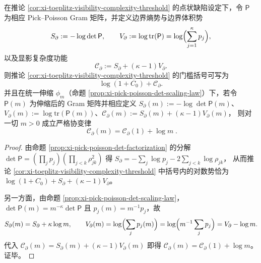 
\begin{corollary}[统一伸缩下的显影复杂度“异常”协变律：\texorpdfstring{$\mathscr{C}_{\partial}(m)=\mathscr{C}_{\partial}(1)+\log m$}{C(m)=C(1)+log m}]\label{cor:xi-toeplitz-visibility-complexity-anomaly}
在推论 \ref{cor:xi-toeplitz-visibility-complexity-threshold} 的点状缺陷设定下，令 \(\mathsf P\) 为相应 Pick--Poisson Gram 矩阵，并定义边界熵势与边界体积势
\[
S_{\partial}:=-\log\det\mathsf P,
\qquad
V_{\partial}:=\log\mathrm{tr}(\mathsf P)=\log\Bigl(\sum_{j=1}^{\kappa}p_j\Bigr),
\]
以及显影复杂度功能
\[
\mathscr{C}_{\partial}:=S_{\partial}+(\kappa-1)V_{\partial}.
\]
则推论 \ref{cor:xi-toeplitz-visibility-complexity-threshold} 的门槛括号可写为
\[
\log(1+C_0)+\mathscr{C}_{\partial}.
\]
并且在统一伸缩 \(\phi_m\)（命题 \ref{prop:xi-pick-poisson-det-scaling-law}）下，若令 \(\mathsf P(m)\) 为伸缩后的 Gram 矩阵并相应定义
\(
S_{\partial}(m):=-\log\det\mathsf P(m)
\)、\(V_{\partial}(m):=\log\mathrm{tr}(\mathsf P(m))\)、\(\mathscr{C}_{\partial}(m):=S_{\partial}(m)+(\kappa-1)V_{\partial}(m)\)，
则对一切 \(m>0\) 成立严格协变律
\[
\boxed{\;
\mathscr{C}_{\partial}(m)=\mathscr{C}_{\partial}(1)+\log m\; }.
\]
\end{corollary}
\begin{proof}
由命题 \ref{prop:xi-pick-poisson-det-factorization} 的分解
\(
\det\mathsf P=(\prod_j p_j)(\prod_{j<k}\rho_{jk}^2)
\)
得
\(
S_{\partial}=-\sum_j\log p_j-2\sum_{j<k}\log\rho_{jk}
\)，
从而推论 \ref{cor:xi-toeplitz-visibility-complexity-threshold} 中括号内的对数势恰为
\(
\log(1+C_0)+S_{\partial}+(\kappa-1)V_{\partial}
\)。
\par
另一方面，由命题 \ref{prop:xi-pick-poisson-det-scaling-law}，
\(
\det\mathsf P(m)=m^{-\kappa}\det\mathsf P
\)
且 \(p_j(m)=m^{-1}p_j\)，故
\[
S_{\partial}(m)=S_{\partial}+\kappa\log m,
\qquad
V_{\partial}(m)=\log\Bigl(\sum_j p_j(m)\Bigr)=\log\Bigl(m^{-1}\sum_j p_j\Bigr)=V_{\partial}-\log m.
\]
代入 \(\mathscr{C}_{\partial}(m)=S_{\partial}(m)+(\kappa-1)V_{\partial}(m)\) 即得
\(
\mathscr{C}_{\partial}(m)=\mathscr{C}_{\partial}(1)+\log m
\)。
证毕。
\end{proof}

